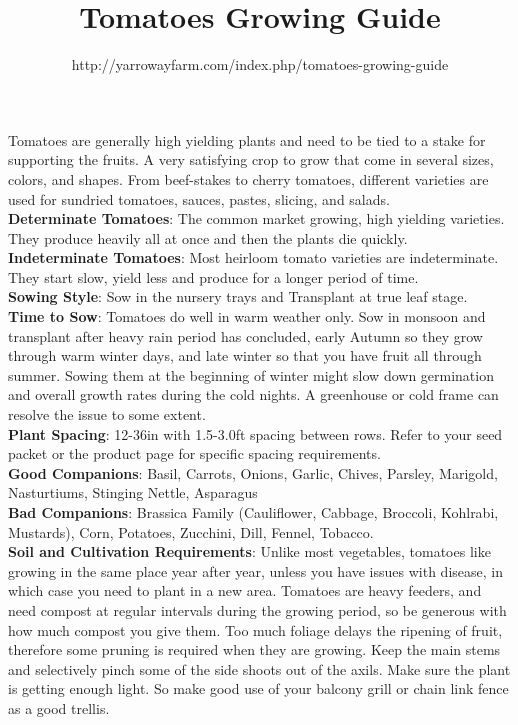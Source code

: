 \documentclass[12]{article}
\title{Tomatoes Growing Guide}
\author{http://yarrowayfarm.com/index.php/tomatoes-growing-guide}
\date{}
\begin{document}
\maketitle

Tomatoes are generally high yielding plants and need to be tied to a stake for supporting the fruits. A very satisfying crop to grow that come in several sizes, colors, and shapes. From beef-stakes to cherry tomatoes, different varieties are used for sundried tomatoes, sauces, pastes, slicing, and salads.\\

\textbf{\color{red}Determinate Tomatoes}: The common market growing, high yielding varieties. They produce heavily all at once and then the plants die quickly.\\

\textbf{\color{red}Indeterminate Tomatoes}: Most heirloom tomato varieties are indeterminate. They start slow, yield less and produce for a longer period of time.\\

\textbf{\color{red}Sowing Style}: Sow in the nursery trays and Transplant at true leaf stage.\\

\textbf{\color{red}Time to Sow}: Tomatoes do well in warm weather only. Sow in monsoon and transplant after heavy rain period has concluded, early Autumn so they grow through warm winter days, and late winter so that you have fruit all through summer. Sowing them at the beginning of winter might slow down germination and overall growth rates during the cold nights. A greenhouse or cold frame can resolve the issue to some extent.\\

\textbf{\color{red}Plant Spacing}: 12-36in with 1.5-3.0ft spacing between rows. Refer to your seed packet or the product page for specific spacing requirements.\\

\textbf{\color{red}Good Companions}: Basil, Carrots, Onions, Garlic, Chives, Parsley, Marigold, Nasturtiums, Stinging Nettle, Asparagus\\

\textbf{\color{red}Bad Companions}: Brassica Family (Cauliflower, Cabbage, Broccoli, Kohlrabi, Mustards), Corn, Potatoes, Zucchini, Dill, Fennel, Tobacco.\\

\textbf{\color{red}Soil and Cultivation Requirements}: Unlike most vegetables, tomatoes like growing in the same place year after year, unless you have issues with disease, in which case you need to plant in a new area. Tomatoes are heavy feeders, and need compost at regular intervals during the growing period, so be generous with how much compost you give them. Too much foliage delays the ripening of fruit, therefore some pruning is required when they are growing. Keep the main stems and selectively pinch some of the side shoots out of the axils. Make sure the plant is getting enough light. So make good use of your balcony grill or chain link fence as a good trellis.\\
\end{document}
